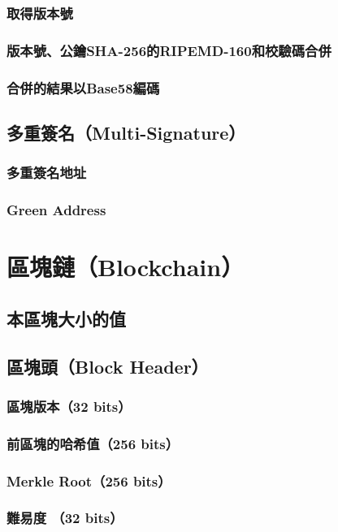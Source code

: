 		\subsubsection{取得版本號}
		\subsubsection{版本號、公鑰SHA-256的RIPEMD-160和校驗碼合併}
		\subsubsection{合併的結果以Base58編碼}

	\subsection{多重簽名（Multi-Signature）}
		\subsubsection{多重簽名地址}
		\subsubsection{Green Address}

	\section{區塊鏈（Blockchain）}
		\subsection{本區塊大小的值 }
		\subsection{區塊頭（Block Header）}
			\subsubsection{區塊版本（32 bits）}
			\subsubsection{前區塊的哈希值（256 bits）}
			\subsubsection{Merkle Root（256 bits）}
			\subsubsection{難易度 （32 bits）}
